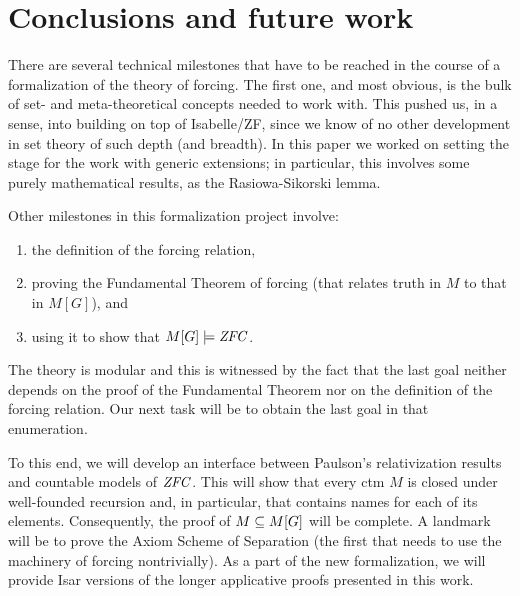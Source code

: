 \section{Conclusions and future work}
There are several technical milestones that have to be reached in the
course of a formalization of the theory of forcing. The first one, and most
obvious, is the bulk of set- and meta-theoretical concepts needed to work
with. This pushed us, in a sense,  into building on top of Isabelle/ZF,
since we know of no other development in set theory of such
depth (and breadth). In this paper we worked on setting the stage for the work with
generic extensions; in particular, this involves some purely mathematical
results, as the Rasiowa-Sikorski lemma. 

Other milestones in this formalization project
involve:
\begin{enumerate}
\item the definition
  of the forcing relation, 
\item proving the Fundamental Theorem of forcing
  (that relates truth in $M$ to that in $M[G]$), and 
\item using it to show
  that $M[G]\models \mathit{ZFC}$. 
\end{enumerate}
The theory is modular and this is
witnessed by the fact 
that the last goal neither depends on the proof of the Fundamental
Theorem nor on the definition of the forcing relation. Our next task
will be to obtain the last goal in that enumeration. 

To this end, we will develop an interface between Paulson's
relativization results and countable models of $\mathit{ZFC}$. This will show
that every ctm $M$ is closed under well-founded recursion and, in
particular, that contains names for each of its
elements. Consequently, the proof of  $M\subseteq M[G]$ will be
complete. A landmark will be to prove the Axiom Scheme
of Separation (the first that needs to use the machinery of forcing
nontrivially). As a part of the new formalization, we will provide
Isar versions of the longer applicative proofs presented in this work.


